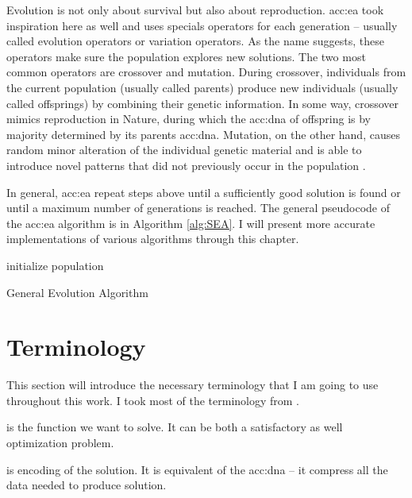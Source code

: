 Evolution is not only about survival but also about reproduction. \acrlong*{acc:ea} took inspiration here as well and uses specials operators for each generation -- usually called evolution operators or variation operators. As the name suggests, these operators make sure the population explores new solutions. The two most common operators are crossover and mutation. During crossover, individuals from the current population (usually called parents) produce new individuals (usually called offsprings) by combining their genetic information. In some way, crossover mimics reproduction in Nature, during which the \acrshort{acc:dna} of offspring is by majority determined by its parents \acrshort{acc:dna}. Mutation, on the other hand, causes random minor alteration of the individual genetic material and is able to introduce novel patterns that did not previously occur in the population \citep{HowToSolveItModernHeuristics}.

In general, \acrshort{acc:ea} repeat steps above until a sufficiently good solution is found or until a maximum number of generations is reached. The general pseudocode of the \acrshort{acc:ea} algorithm is in Algorithm \ref{alg:SEA}. I will present more accurate implementations of various algorithms through this chapter.

\begin{algorithm}
    \SetAlgoLined
    initialize population\;
    \caption{General Evolution Algorithm}
    \label{alg:SEA}
\end{algorithm}




\section{Terminology}

This section will introduce the necessary terminology that I am going to use throughout this work. I took most of the terminology from \citet{IntroductionToEA}.

 is the function we want to solve. It can be both a satisfactory as well optimization problem.

 is encoding of the solution. It is equivalent of the \acrshort{acc:dna} -- it compress all the data needed to produce solution.

